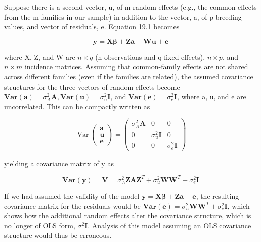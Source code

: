 \documentclass{article}
\begin{document}
Suppose there is a second vector, u, of m random effects (e.g., the common effects from the m families in our sample) in addition to the vector, a, of p breeding values, and vector of residuals, e. Equation 19.1 becomes

\begin{equation}
\mathbf{y}=\mathbf{X}\boldsymbol{\beta}+\mathbf{Z}\mathbf{a}+\mathbf{W}\mathbf{u}+\mathbf{e}
\tag{19.20a}
\label{eq:19_20a}
\end{equation}

where X, Z, and W are  $ n \times q $ (n observations and q fixed effects),  $ n \times p $, and  $ n \times m $ incidence matrices. Assuming that common-family effects are not shared across different families (even if the families are related), the assumed covariance structures for the three vectors of random effects become  $ \mathbf{Var}(\mathbf{a}) = \sigma_A^2 \mathbf{A}, \mathbf{Var}(\mathbf{u}) = \sigma_u^2 \mathbf{I} $, and  $ \mathbf{Var}(\mathbf{e}) = \sigma_e^2 \mathbf{I} $, where a, u, and e are uncorrelated. This can be compactly written as

\begin{equation}
\operatorname{Var}\begin{pmatrix}{{{\mathbf{a}}}} \\{{{\mathbf{u}}}} \\{{{\mathbf{e}}}}\end{pmatrix}=\begin{pmatrix}{{{\sigma_{A}^{2}\mathbf{A}}}}&{{{0}}}&{{{0}}} \\{{{0}}}&{{{\sigma_{u}^{2}\mathbf{I}}}}&{{{0}}} \\{{{0}}}&{{{0}}}&{{{\sigma_{e}^{2}\mathbf{I}}}}\end{pmatrix}
\tag{19.20b}
\label{eq:19_20b}
\end{equation}

yielding a covariance matrix of y as

\begin{equation}
\mathbf{V a r}(\mathbf{y})=\mathbf{V}=\sigma_{A}^{2}\mathbf{Z}\mathbf{A}\mathbf{Z}^{T}+\sigma_{u}^{2}\mathbf{W}\mathbf{W}^{T}+\sigma_{e}^{2}\mathbf{I}
\tag{19.20c}
\label{eq:19_20c}
\end{equation}

If we had assumed the validity of the model $\mathbf{y} = \mathbf{X}\boldsymbol{\beta} + \mathbf{Z}\mathbf{a} + \mathbf{e}$, the resulting covariance matrix for the residuals would be $\mathbf{Var}(\mathbf{e}) = \sigma_u^2 \mathbf{W}\mathbf{W}^T + \sigma_e^2 \mathbf{I}$, which shows how the additional random effects alter the covariance structure, which is no longer of OLS form, $\sigma^2 \mathbf{I}$. Analysis of this model assuming an OLS covariance structure would thus be erroneous.
\end{document}
